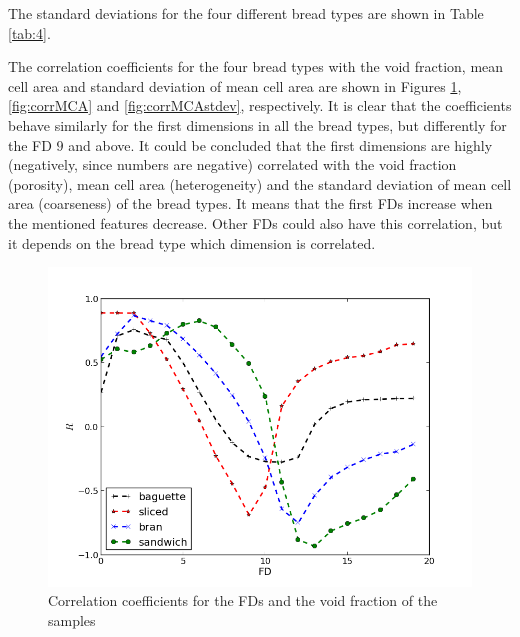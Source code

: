 The standard deviations for the four different bread types are shown in Table \ref{tab:4}. 


The correlation coefficients for the four bread types with the void fraction, mean cell area and standard deviation of mean cell area are shown in Figures \ref{fig:corrVF}, \ref{fig:corrMCA} and \ref{fig:corrMCAstdev}, respectively. It is clear that the coefficients behave similarly for the first dimensions in all the bread types, but differently for the FD $9$ and above. It could be concluded that the first dimensions are highly (negatively, since numbers are negative) correlated with the void fraction (porosity), mean cell area (heterogeneity) and the standard deviation of mean cell area (coarseness) of the bread types. It means that the first FDs increase when the mentioned features decrease. Other FDs could also have this correlation, but it depends on the bread type which dimension is correlated.


\begin{figure}[htb]
\centering
\includegraphics[scale=0.38]{../images/vf}
\caption{Correlation coefficients for the FDs and the void fraction of the samples}
\label{fig:corrVF}
\end{figure}

